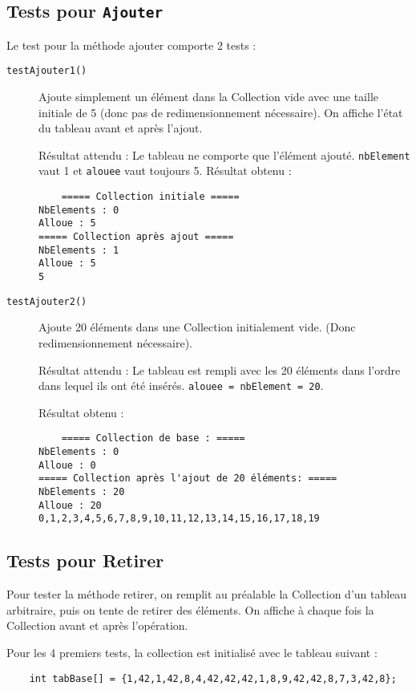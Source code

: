 \documentclass[10pt]{article}
\begin{document}
\subsection{Tests pour \tt Ajouter}
Le test pour la méthode ajouter comporte 2 tests :

\begin{description}

	\item[\texttt{testAjouter1()}] Ajoute simplement un élément dans la Collection vide avec une taille initiale de 5 (donc pas de redimensionnement nécessaire). On affiche l'état du tableau avant et après l'ajout.
	
	Résultat attendu : Le tableau ne comporte que l'élément ajouté. \texttt{nbElement} vaut 1 et \texttt{alouee} vaut toujours 5.
		Résultat obtenu :
	\begin{verbatim}
	===== Collection initiale =====
NbElements : 0
Alloue : 5
===== Collection après ajout =====
NbElements : 1
Alloue : 5
5
\end{verbatim}
	
	\item[\texttt{testAjouter2()}] Ajoute 20 éléments dans une Collection initialement vide. (Donc redimensionnement nécessaire).
	
	Résultat attendu : Le tableau est rempli avec les 20 éléments dans l'ordre dans lequel ils ont été insérés. \texttt{alouee = nbElement = 20}.
	
	Résultat obtenu :
	\begin{verbatim}
	===== Collection de base : =====
NbElements : 0
Alloue : 0
===== Collection après l'ajout de 20 éléments: =====
NbElements : 20
Alloue : 20
0,1,2,3,4,5,6,7,8,9,10,11,12,13,14,15,16,17,18,19
\end{verbatim}

	
\end{description}

\subsection{Tests pour Retirer}	
Pour tester la méthode retirer, on remplit au préalable la Collection d'un tableau arbitraire, puis on tente de retirer des éléments. On affiche à chaque fois la Collection avant et après l'opération.

Pour les 4 premiers tests, la collection est initialisé avec le tableau suivant :
\begin{verbatim}
	int tabBase[] = {1,42,1,42,8,4,42,42,42,1,8,9,42,42,8,7,3,42,8};
\end{verbatim}
\end{document}
